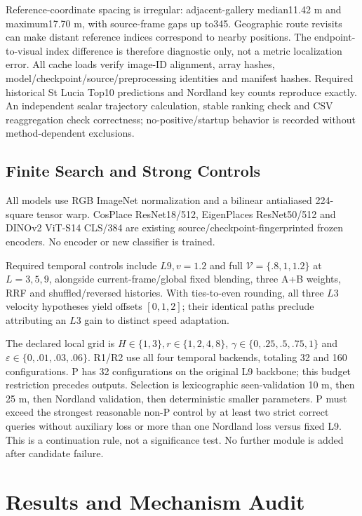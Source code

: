 \documentclass[conference]{IEEEtran}
\begin{document}
Reference-coordinate spacing is irregular: adjacent-gallery median11.42 m and maximum17.70 m, with source-frame gaps up to345. Geographic route revisits can make distant reference indices correspond to nearby positions. The endpoint-to-visual index difference is therefore diagnostic only, not a metric localization error. All cache loads verify image-ID alignment, array hashes, model/checkpoint/source/preprocessing identities and manifest hashes. Required historical St Lucia Top10 predictions and Nordland key counts reproduce exactly. An independent scalar trajectory calculation, stable ranking check and CSV reaggregation check correctness; no-positive/startup behavior is recorded without method-dependent exclusions.

\subsection{Finite Search and Strong Controls}
All models use RGB ImageNet normalization and a bilinear antialiased 224-square tensor warp. CosPlace ResNet18/512, EigenPlaces ResNet50/512 and DINOv2 ViT-S14 CLS/384 are existing source/checkpoint-fingerprinted frozen encoders. No encoder or new classifier is trained.

Required temporal controls include $L9,v=1.2$ and full $\mathcal V=\{.8,1,1.2\}$ at $L=3,5,9$, alongside current-frame/global fixed blending, three A+B weights, RRF and shuffled/reversed histories. With ties-to-even rounding, all three $L3$ velocity hypotheses yield offsets $[0,1,2]$; their identical paths preclude attributing an $L3$ gain to distinct speed adaptation.

The declared local grid is $H\in\{1,3\},r\in\{1,2,4,8\}$, $\gamma\in\{0,.25,.5,.75,1\}$ and $\varepsilon\in\{0,.01,.03,.06\}$. R1/R2 use all four temporal backends, totaling 32 and 160 configurations. P has 32 configurations on the original L9 backbone; this budget restriction precedes outputs. Selection is lexicographic seen-validation 10 m, then 25 m, then Nordland validation, then deterministic smaller parameters. P must exceed the strongest reasonable non-P control by at least two strict correct queries without auxiliary loss or more than one Nordland loss versus fixed L9. This is a continuation rule, not a significance test. No further module is added after candidate failure.



\section{Results and Mechanism Audit}
\end{document}
